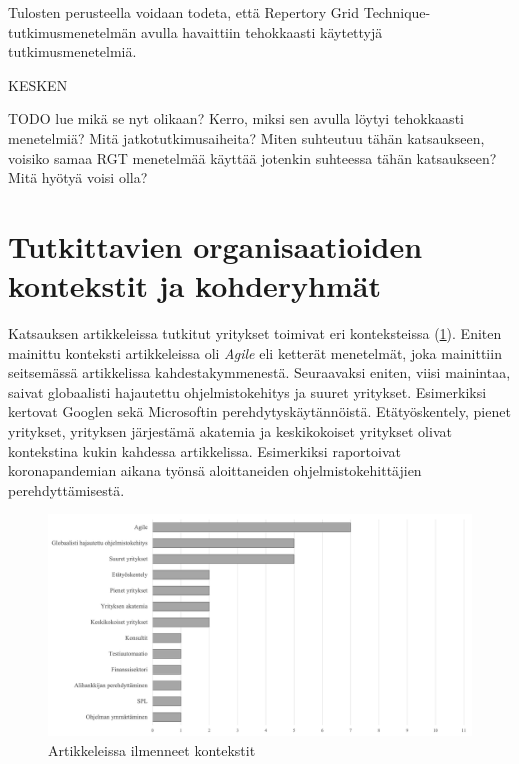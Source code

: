 \documentclass[utf8]{gradu3}
\begin{document}
Tulosten perusteella voidaan todeta, että Repertory Grid Technique-tutkimusmenetelmän avulla havaittiin tehokkaasti käytettyjä tutkimusmenetelmiä. 

KESKEN

TODO lue mikä se nyt olikaan? Kerro, miksi sen avulla löytyi tehokkaasti menetelmiä? Mitä jatkotutkimusaiheita? Miten suhteutuu tähän katsaukseen, voisiko samaa RGT menetelmää käyttää jotenkin suhteessa tähän katsaukseen? Mitä hyötyä voisi olla?


\section{Tutkittavien organisaatioiden kontekstit ja kohderyhmät}

Katsauksen artikkeleissa tutkitut yritykset toimivat eri konteksteissa (\ref{kuvio:kontekstit}). Eniten mainittu konteksti artikkeleissa oli \textit{Agile} eli ketterät menetelmät, joka mainittiin seitsemässä artikkelissa kahdestakymmenestä. Seuraavaksi eniten, viisi mainintaa, saivat globaalisti hajautettu ohjelmistokehitys ja suuret yritykset. Esimerkiksi \textcite{johnson-senges-2010} kertovat Googlen sekä \textcite{rodeghero-ym-2021} \textcite{ju-ym-2021} Microsoftin perehdytyskäytännöistä. Etätyöskentely, pienet yritykset, yrityksen järjestämä akatemia ja keskikokoiset yritykset olivat kontekstina kukin kahdessa artikkelissa. Esimerkiksi \textcite{rodeghero-ym-2021} raportoivat koronapandemian aikana työnsä aloittaneiden ohjelmistokehittäjien perehdyttämisestä.

\begin{figure}[h]
    \centering
    \includegraphics[width=\textwidth]{media/kontekstit.png}
    \caption{Artikkeleissa ilmenneet kontekstit}
    \label{kuvio:kontekstit}
\end{figure}
\end{document}
